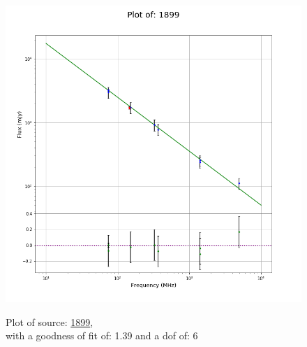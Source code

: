 \documentclass{article}
\begin{document}
\begin{figure}[H]
\begin{minipage}{0.5\textwidth}
        \includegraphics[scale = 0.35]{KmeulenTrap4P23_1hr/1hr1899.png}
        \captionsetup{labelformat=empty}
        \caption{Plot of source: \href{http://banana.transientskp.org/r4/vlo_KmeulenTrap4P23/runningcatalog/1899}{1899},\\with a goodness of fit of: 1.39 and a dof of: 6}
    \addtocounter{figure}{-1}
    \label{KmeulenTrap4P23:1hr:1899:plot}
    \end{minipage}
\end{figure}
\end{document}
